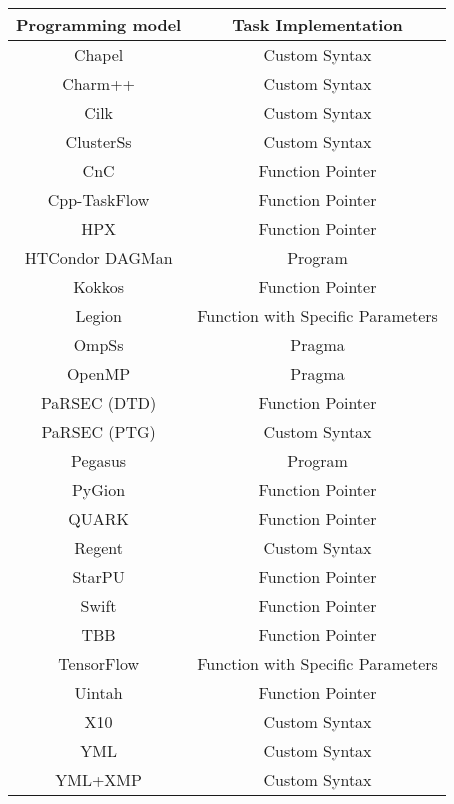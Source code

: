 \begin{tabular}{cc}
\hline
Programming model & Task Implementation \\
\hline
Chapel & Custom Syntax\\
Charm++ & Custom Syntax\\
Cilk & Custom Syntax\\
ClusterSs & Custom Syntax\\
CnC & Function Pointer\\
Cpp-TaskFlow & Function Pointer\\
HPX & Function Pointer\\
HTCondor DAGMan & Program\\
Kokkos & Function Pointer\\
Legion & Function with Specific Parameters\\
OmpSs & Pragma\\
OpenMP & Pragma\\
PaRSEC (DTD) & Function Pointer\\
PaRSEC (PTG) & Custom Syntax\\
Pegasus & Program\\
PyGion & Function Pointer\\
QUARK & Function Pointer\\
Regent & Custom Syntax\\
StarPU & Function Pointer\\
Swift & Function Pointer\\
TBB & Function Pointer\\
TensorFlow & Function with Specific Parameters\\
Uintah & Function Pointer\\
X10 & Custom Syntax\\
YML & Custom Syntax\\
YML+XMP & Custom Syntax\\
\hline
\end{tabular}
